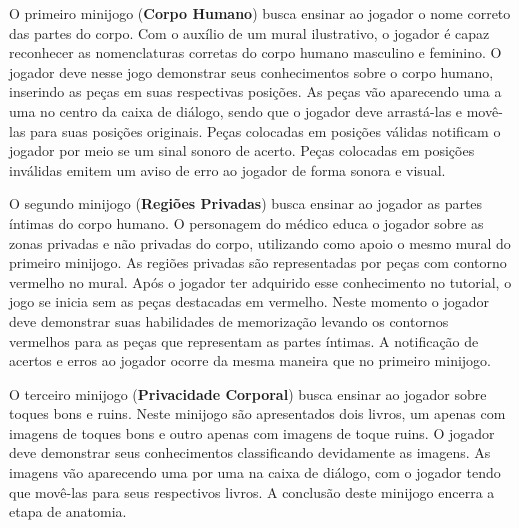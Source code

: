 \begin{figure}
  \vspace{-1.0cm}
\end{figure}

O primeiro minijogo (\textbf{Corpo Humano}) busca ensinar ao jogador o nome correto das partes do corpo. Com o auxílio de um mural ilustrativo, o jogador é capaz reconhecer as nomenclaturas corretas do corpo humano masculino e feminino. %
O jogador deve nesse jogo demonstrar seus conhecimentos sobre o corpo humano, inserindo as peças em suas respectivas posições. As peças vão aparecendo uma a uma no centro da caixa de diálogo, sendo que o jogador deve arrastá-las e movê-las para suas posições originais. Peças colocadas em posições válidas notificam o jogador por meio se um sinal sonoro de acerto. Peças colocadas em posições inválidas emitem um aviso de erro ao jogador de forma sonora e visual. 

O segundo minijogo (\textbf{Regiões Privadas}) busca ensinar ao jogador as partes íntimas do corpo humano. O personagem do médico educa o jogador sobre as zonas privadas e não privadas do corpo, utilizando como apoio o mesmo mural do primeiro minijogo. As regiões privadas são representadas por peças com contorno vermelho no mural. Após o jogador ter adquirido esse conhecimento no tutorial, o jogo se inicia sem as peças destacadas em vermelho. Neste momento o jogador deve demonstrar suas habilidades de memorização levando os contornos vermelhos para as peças que representam as partes íntimas. A notificação de acertos e erros ao jogador ocorre da mesma maneira que no primeiro minijogo. %

O terceiro minijogo (\textbf{Privacidade Corporal}) busca ensinar ao jogador sobre toques bons e ruins. Neste minijogo são apresentados dois livros, um apenas com imagens de toques bons e outro apenas com imagens de toque ruins. %
O jogador deve demonstrar seus conhecimentos classificando devidamente as imagens. As imagens vão aparecendo uma por uma na caixa de diálogo, com o jogador tendo que movê-las para seus respectivos livros. A conclusão deste minijogo encerra a etapa de anatomia. %


